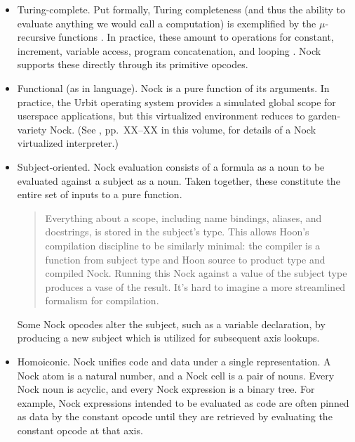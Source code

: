 \documentclass[twoside]{article}
\begin{document}
\begin{itemize}
  \item  Turing-complete.  Put formally, Turing completeness (and thus the ability to evaluate anything we would call a computation) is exemplified by the $μ$-recursive functions \citep{WikipediaMuRecursive}.  In practice, these amount to operations for constant, increment, variable access, program concatenation, and looping \citep{Raphael2012}.  Nock supports these directly through its primitive opcodes.

  \item  Functional (as in language).  Nock is a pure function of its arguments.  In practice, the Urbit operating system provides a simulated global scope for userspace applications, but this virtualized environment reduces to garden-variety Nock.  (See \citet{Davis2025b}, pp.~XX–XX in this volume, for details of a Nock virtualized interpreter.)
  \item  Subject-oriented.  Nock evaluation consists of a formula as a noun to be evaluated against a subject as a noun.  Taken together, these constitute the entire set of inputs to a pure function.

    \begin{quote}
    Everything about a scope, including name bindings, aliases, and docstrings, is stored in the subject's type. This allows Hoon's compilation discipline to be similarly minimal: the compiler is a function from subject type and Hoon source to product type and compiled Nock. Running this Nock against a value of the subject type produces a vase of the result. It's hard to imagine a more streamlined formalism for compilation.  \citep{Blackman2020}
    \end{quote}

    \noindent
    Some Nock opcodes alter the subject, such as a variable declaration, by producing a new subject which is utilized for subsequent axis lookups.

  \item  Homoiconic.  Nock unifies code and data under a single representation.  A Nock atom is a natural number, and a Nock cell is a pair of nouns.  Every Nock noun is acyclic, and every Nock expression is a binary tree.  For example, Nock expressions intended to be evaluated as code are often pinned as data by the constant opcode until they are retrieved by evaluating the constant opcode at that axis.


\end{itemize}
\end{document}
